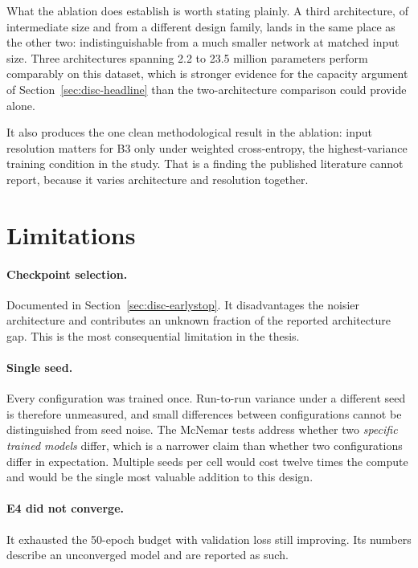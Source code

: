 What the ablation does establish is worth stating plainly. A third architecture, of
intermediate size and from a different design family, lands in the same place as the
other two: indistinguishable from a much smaller network at matched input size. Three
architectures spanning 2.2 to 23.5 million parameters perform comparably on this dataset,
which is stronger evidence for the capacity argument of
Section~\ref{sec:disc-headline} than the two-architecture comparison could provide alone.

It also produces the one clean methodological result in the ablation: input resolution
matters for B3 only under weighted cross-entropy, the highest-variance training condition
in the study. That is a finding the published literature cannot report, because it varies
architecture and resolution together.

\section{Limitations}
\label{sec:disc-limitations}

\paragraph{Checkpoint selection.} Documented in
Section~\ref{sec:disc-earlystop}. It disadvantages the noisier architecture and
contributes an unknown fraction of the reported architecture gap. This is the most
consequential limitation in the thesis.

\paragraph{Single seed.} Every configuration was trained once. Run-to-run variance under
a different seed is therefore unmeasured, and small differences between configurations
cannot be distinguished from seed noise. The McNemar tests address whether two
\emph{specific trained models} differ, which is a narrower claim than whether two
configurations differ in expectation. Multiple seeds per cell would cost twelve times the
compute and would be the single most valuable addition to this design.

\paragraph{E4 did not converge.} It exhausted the 50-epoch budget with validation loss
still improving. Its numbers describe an unconverged model and are reported as such.

